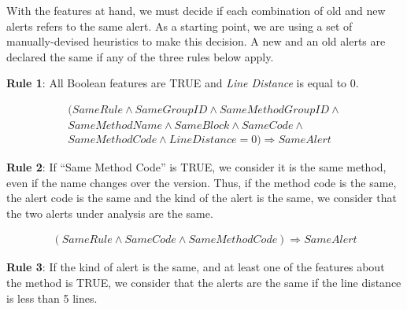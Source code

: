 \documentclass[
]{article}
\begin{document}
With the features at hand, we must decide if each combination of old and
new alerts refers to the same alert. As a starting point, we are using a
set of manually-devised heuristics to make this decision. A new and an old
alerts are declared the same if any of the three rules below apply.

\textbf{Rule 1}: All Boolean features are TRUE and \textit{Line Distance} is equal to 0.

\scriptsize

\[
\begin{aligned}
(SameRule \land SameGroupID \land SameMethodGroupID \land \\
SameMethodName \land SameBlock \land SameCode \land \\
SameMethodCode \land LineDistance = 0) \Rightarrow SameAlert
\end{aligned}\]

\normalsize

\textbf{Rule 2}: If ``Same Method Code'' is TRUE, we consider it is the same
method, even if the name changes over the version. Thus, if the method code 
is the same, the alert code is the same and the kind of the alert is the same,
we consider that the two alerts under analysis are the same.





\scriptsize \[
\begin{aligned}
(SameRule \land SameCode \land SameMethodCode) \Rightarrow SameAlert
\end{aligned}\]

\normalsize

\textbf{Rule 3}: If the kind of alert is the same, and at least one of the features about
the method is TRUE, we consider that the alerts are the same if the line
distance is less than 5 lines.
\end{document}
